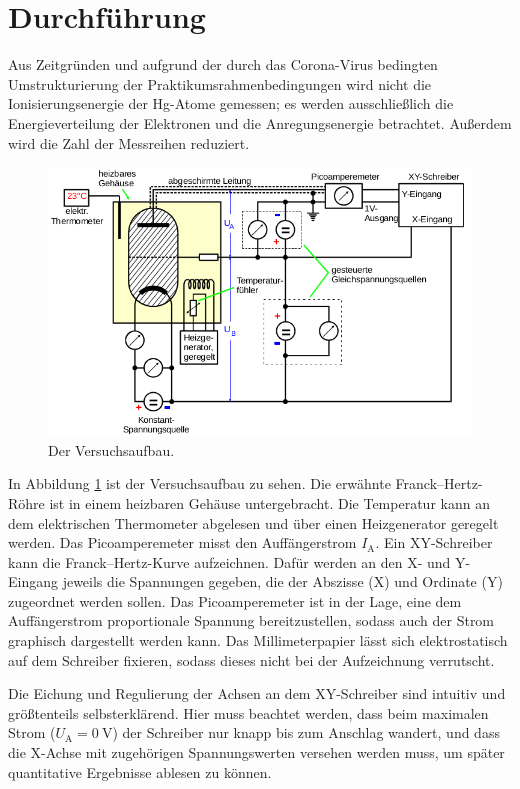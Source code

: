 \section{Durchführung}
\label{sec:Durchführung}

Aus Zeitgründen und aufgrund der durch das Corona-Virus bedingten Umstrukturierung der Praktikumsrahmenbedingungen 
wird nicht die Ionisierungsenergie der Hg-Atome gemessen; es werden ausschließlich die Energieverteilung der Elektronen 
und die Anregungsenergie betrachtet. Außerdem wird die Zahl der Messreihen reduziert. 

\begin{figure}
    \centering
    \includegraphics[width=\textwidth]{plots/Aufbau.png}
    \caption{Der Versuchsaufbau\cite{Versuchsanleitung}.}
    \label{fig:Aufbau}
\end{figure}
In Abbildung \ref{fig:Aufbau} ist der Versuchsaufbau zu sehen. 
Die erwähnte Franck--Hertz-Röhre ist in einem heizbaren Gehäuse untergebracht. Die Temperatur kann an dem elektrischen 
Thermometer abgelesen und über einen Heizgenerator geregelt werden. 
Das Picoamperemeter misst den Auffängerstrom $I_\text{A}$.
Ein XY-Schreiber kann die Franck--Hertz-Kurve aufzeichnen. Dafür werden an den X- und Y-Eingang jeweils die Spannungen 
gegeben, die der Abszisse (X) und Ordinate (Y) zugeordnet werden sollen. 
Das Picoamperemeter ist in der Lage, eine dem Auffängerstrom proportionale Spannung bereitzustellen, sodass auch der 
Strom graphisch dargestellt werden kann. 
Das Millimeterpapier lässt sich elektrostatisch auf dem Schreiber fixieren, sodass dieses nicht bei der Aufzeichnung verrutscht. 

Die Eichung und Regulierung der Achsen an dem XY-Schreiber sind intuitiv und größtenteils selbsterklärend. 
Hier muss beachtet werden, dass beim maximalen Strom ($U_\text{A}=\SI{0}{\volt}$) der Schreiber nur knapp bis zum 
Anschlag wandert, und dass die X-Achse mit zugehörigen Spannungswerten versehen werden muss, um später quantitative Ergebnisse 
ablesen zu können. 
\\

